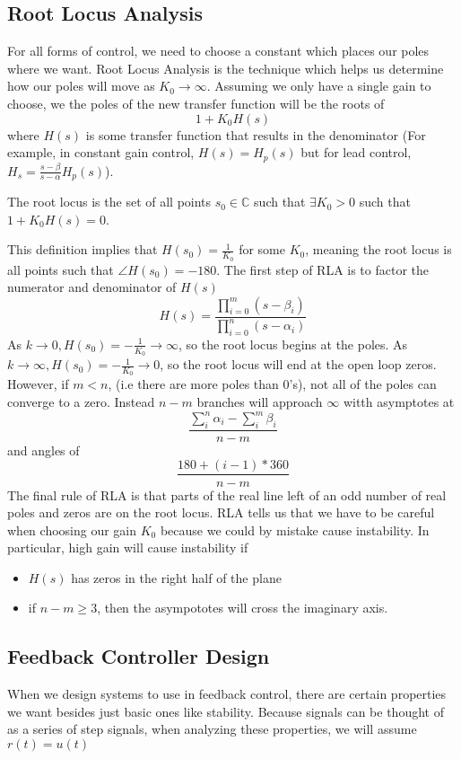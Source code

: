 \subsection{Root Locus Analysis}
For all forms of control, we need to choose a constant which places our poles where we want. Root Locus Analysis
is the technique which helps us determine how our poles will move as $K_0\rightarrow \infty$.
Assuming we only have a single gain to choose, we the poles of the new transfer function will be the roots of
$$1 + K_0H(s)$$ where $H(s)$ is some transfer function that results in the denominator (For example, in constant gain control, $H(s) = H_p(s)$ but for
lead control, $H_s = \frac{s-\beta}{s-\alpha}H_p(s)$).
\begin{definition}
    The root locus is the set of all points $s_0\in \mathbb{C}$ such that $\exists K_0>0$ such that $1+K_0H(s)=0$.
\end{definition}
This definition implies that $H(s_0)=\frac{1}{K_0}$ for some $K_0$, meaning the root locus is all points such that $\angle H(s_0)=-180$\textdegree.
The first step of RLA is to factor the numerator and denominator of $H(s)$
$$H(s) = \frac{\prod_{i=0}^{m}{(s-\beta_i)}}{\prod_{i=0}^{n}{(s-\alpha_i)}}$$
As $k\rightarrow 0, H(s_0)=-\frac{1}{K_0}\rightarrow \infty$, so the root locus begins at the poles.
As $k\rightarrow \infty, H(s_0)=-\frac{1}{K_0}\rightarrow 0$, so the root locus will end at the open loop zeros.
However, if $m < n$, (i.e there are more poles than 0's), not all of the poles can converge to a zero.
Instead $n-m$ branches will approach $\infty$ witth asymptotes at
$$\frac{\sum_i^n\alpha_i-\sum_i^m\beta_i}{n-m}$$ and angles of
$$\frac{180 + (i-1)*360}{n-m}$$
The final rule of RLA is that parts of the real line left of an odd number of real poles and zeros are on the root locus.
RLA tells us that we have to be careful when choosing our gain $K_0$ because we could by mistake cause instability. In particular, high gain will cause instability if
\begin{itemize}
    \item $H(s)$ has zeros in the right half of the plane
    \item if $n-m \ge 3$, then the asympototes will cross the imaginary axis.
\end{itemize}
\subsection{Feedback Controller Design}
When we design systems to use in feedback control, there are certain properties we want besides just basic ones like stability.
Because signals can be thought of as a series of step signals, when analyzing these properties,
we will assume $r(t)=u(t)$ 
